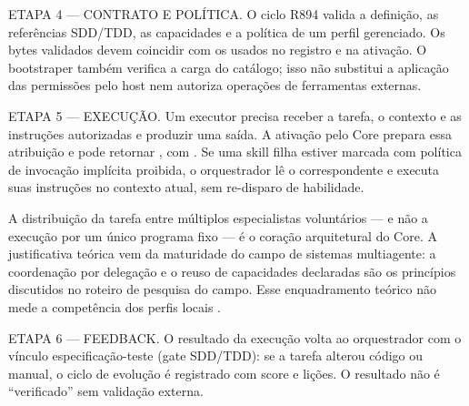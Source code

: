 \begin{processo}
ETAPA 4 — CONTRATO E POLÍTICA. O ciclo R894 valida a definição, as referências
SDD/TDD, as capacidades e a política de um perfil gerenciado. Os bytes validados
devem coincidir com os usados no registro e na ativação. O bootstraper também
verifica a carga do catálogo; isso não substitui a aplicação das permissões
pelo host nem autoriza operações de ferramentas externas.
\end{processo}

\begin{processo}
ETAPA 5 — EXECUÇÃO. Um executor precisa receber a tarefa, o contexto e as
instruções autorizadas e produzir uma saída. A ativação pelo Core prepara essa
atribuição e pode retornar , com .
Se uma skill filha estiver marcada com
política de invocação implícita proibida, o orquestrador lê o
 correspondente e executa suas instruções no contexto atual,
sem re-disparo de habilidade.
\end{processo}

A distribuição da tarefa entre múltiplos especialistas voluntários — e não a
execução por um único programa fixo — é o coração arquitetural do Core. A
justificativa teórica vem da maturidade do campo de sistemas multiagente: a
coordenação por delegação e o reuso de capacidades declaradas são os
princípios discutidos no roteiro de pesquisa do campo. Esse enquadramento
teórico não mede a competência dos perfis locais .\begin{processo}
ETAPA 6 — FEEDBACK. O resultado da execução volta ao orquestrador com o
vínculo especificação-teste (gate SDD/TDD): se a tarefa alterou código ou
manual, o ciclo de evolução é registrado com score e lições. O resultado não
é ``verificado'' sem validação externa.
\end{processo}

